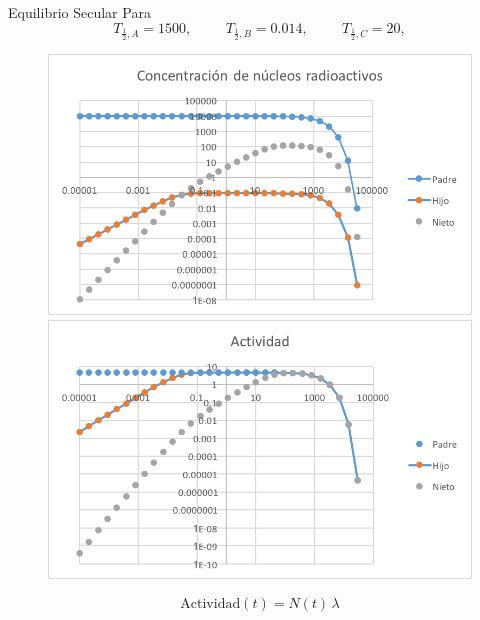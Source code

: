 \documentclass[9pt]{beamer}
\begin{document}
\begin{frame}[noframenumbering]{Equilibrio Secular}
Para 
\begin{equation}
T_{\frac{1}{2}, A} = 1500, \hspace{1cm} T_{\frac{1}{2}, B} = 0.014, \hspace{1cm} T_{\frac{1}{2}, C} = 20,
\end{equation}
\begin{figure}
\includegraphics[height=0.4\textheight]{Imagenes/EquilibrioSecular1.png}
\includegraphics[height=0.4\textheight]{Imagenes/EquilibrioSecular2.png}
\end{figure}
\begin{equation}
\text{Actividad}(t) = N(t)\,\lambda
\end{equation}
	\begin{flushright}
	\hyperlink{Portada}{}
	\end{flushright}
\end{frame}
\end{document}
